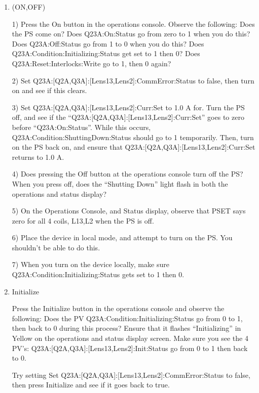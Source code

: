 \documentclass[11pt]{book}		%
\begin{document}
\begin{enumerate}
 
\item (ON,OFF) 

\color{red}
1) Press the On button in the operations console. Observe the following: 
	Does the PS come on? 
	Does Q23A:On:Status go from zero to 1 when you do this? 
	Does Q23A:Off:Status go from 1 to 0 when you do this? 
	Does Q23A:Condition:Initializing:Status get set to 1 then 0?
	Does Q23A:Reset:Interlocks:Write go to 1, then 0 again?

2) Set Q23A:[Q2A,Q3A]:[Lens13,Lens2]:CommError:Status to false, then turn on and see if this clears.

3) Set Q23A:[Q2A,Q3A]:[Lens13,Lens2]:Curr:Set to 1.0 A for. Turn the PS off, and see if the ``Q23A:[Q2A,Q3A]:[Lens13,Lens2]:Curr:Set'' goes to zero before ``Q23A:On:Status''. While this occurs, Q23A:Condition:ShuttingDown:Status should go to 1 temporarily. Then, turn on the PS back on, and ensure that Q23A:[Q2A,Q3A]:[Lens13,Lens2]:Curr:Set returns to 1.0 A.

4) Does pressing the Off button at the operations console turn off the PS? When you press off, does the ``Shutting Down'' light flash in both the operations and status display?

5) On the Operations Console, and Status display, observe that PSET says zero for all 4 coils, L13,L2 when the PS is off.

6) Place the device in local mode, and attempt to turn on the PS. You shouldn't be able to do this.

7) When you turn on the device locally, make sure Q23A:Condition:Initializing:Status gets set to 1 then 0.


\color{black}

 \item Initialize

\color{red}

Press the Initialize button in the operations console and observe the following: 
	Does the PV Q23A:Condition:Initializing:Status go from 0 to 1, then back to 0 during this process? 
	Ensure that it flashes ``Initializing'' in Yellow on the operations and status display screen. 
	Make sure you see the 4 PV's: Q23A:[Q2A,Q3A]:[Lens13,Lens2]:Init:Status go from 0 to 1 then back to 0.

Try setting Set Q23A:[Q2A,Q3A]:[Lens13,Lens2]:CommError:Status to false, then press Initialize and see if it goes back to true.


\color{black}


\end{enumerate}
\end{document}
